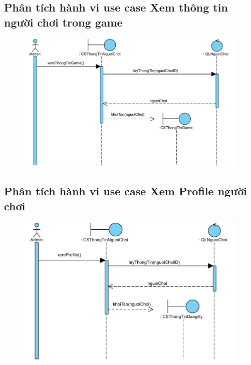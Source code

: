 \documentclass[3p]{elsarticle}
\begin{document}
\subsection{Phân tích hành vi use case Xem thông tin người chơi trong game}
\begin{figure}[!htbp]
	\hspace*{-.5in}
	\centering
	\includegraphics[scale=.55]{images/sequence-pdfs/admin/viewPlayerGameInfo.pdf}
\end{figure}
\newpage

\subsection{Phân tích hành vi use case Xem Profile người chơi}
\begin{figure}[!htbp]
	\hspace*{-.5in}
	\centering
	\includegraphics[scale=.55]{images/sequence-pdfs/admin/viewPlayerProfile.pdf}
\end{figure}
\newpage
\end{document}
